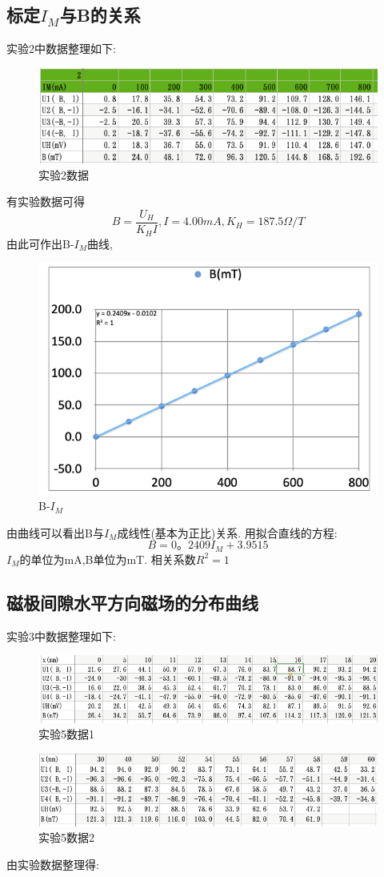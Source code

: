 \documentclass{thuemp}
\begin{document}
\subsection{标定$I_{M}$与B的关系}
实验2中数据整理如下:
\begin{figure}[H]
	\centering
	\includegraphics[width=0.8\linewidth]{./image/n2.png}
	\caption{实验2数据} \label{fig:eg}
\end{figure}
有实验数据可得
\[B=\frac{U_{H}}{K_{H}I},I=4.00mA,K_{H}=187.5 \Omega/T\]
由此可作出B-$I_{M}$曲线,
\begin{figure}[H]
	\centering
	\includegraphics[width=0.8\linewidth]{./image/4.png}
	\caption{B-$I_{M}$} \label{fig:eg}
\end{figure}
由曲线可以看出B与$I_{M}$成线性(基本为正比)关系.
用拟合直线的方程:
\[B=0。2409I_{M}+3.9515\]
$I_{M}$的单位为mA,B单位为mT.
相关系数$R^2=1$

\subsection{磁极间隙水平方向磁场的分布曲线}
实验3中数据整理如下:
\begin{figure}[H]
	\centering
	\includegraphics[width=0.8\linewidth]{./image/n4.png}
	\caption{实验5数据1} \label{fig:eg}
\end{figure}
\begin{figure}[H]
	\centering
	\includegraphics[width=0.8\linewidth]{./image/n5.png}
	\caption{实验5数据2} \label{fig:eg}
\end{figure}
由实验数据整理得:
\end{document}
